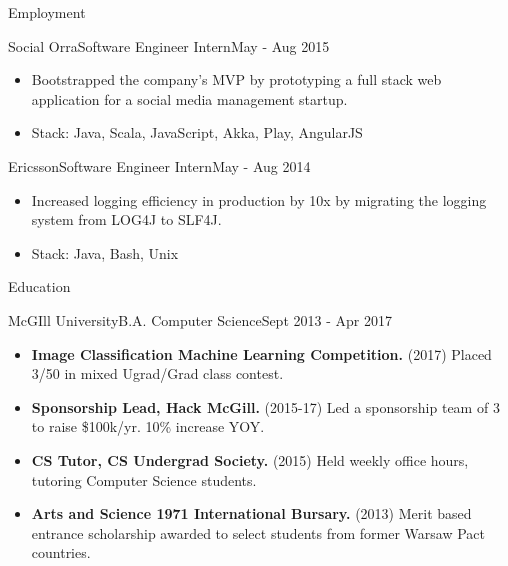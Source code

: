 \documentclass[]{muchicv}
\begin{document}
\begin{cvsection}{Employment}
		\begin{cvsubsection}{Social Orra}{Software Engineer Intern}{May - Aug 2015}
			\begin{itemize}
				\item Bootstrapped the company's MVP by prototyping a full stack web application for a social media management startup.
				\item Stack: Java, Scala, JavaScript, Akka, Play, AngularJS
			\end{itemize}
		\end{cvsubsection}
		
		\begin{cvsubsection}{Ericsson}{Software Engineer Intern}{May - Aug 2014}
			\begin{itemize}
				\item Increased logging efficiency in production by 10x by migrating the logging system from LOG4J to SLF4J.
				\item Stack: Java, Bash, Unix
			\end{itemize}
		\end{cvsubsection}
	\end{cvsection}
	
	\begin{cvsection}{Education}
		\begin{cvsubsection}{McGIll University}{B.A. Computer Science}{Sept 2013 - Apr 2017}
			\begin{itemize}
				\item \textbf{Image Classification Machine Learning Competition.} (2017) Placed 3/50 in mixed Ugrad/Grad class contest.
				\item \textbf{Sponsorship Lead, Hack McGill.} (2015-17) Led a sponsorship team of 3 to raise \$100k/yr. 10\% increase YOY.
				\item \textbf{CS Tutor, CS Undergrad Society.} (2015) Held weekly office hours, tutoring Computer Science students.
				\item \textbf{Arts and Science 1971 International Bursary.} (2013) Merit based entrance scholarship awarded to select students from former Warsaw Pact countries.
			\end{itemize}
		\end{cvsubsection}
	\end{cvsection}
	
\end{document}
